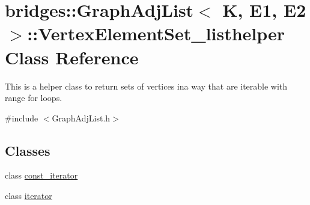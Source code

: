 \hypertarget{classbridges_1_1_graph_adj_list_1_1_vertex_element_set__listhelper}{}\section{bridges\+::Graph\+Adj\+List$<$ K, E1, E2 $>$\+::Vertex\+Element\+Set\+\_\+listhelper Class Reference}
\label{classbridges_1_1_graph_adj_list_1_1_vertex_element_set__listhelper}


This is a helper class to return sets of vertices ina way that are iterable with range for loops.  




{\ttfamily \#include $<$Graph\+Adj\+List.\+h$>$}

\subsection*{Classes}
\begin{DoxyCompactItemize}
\item 
class \mbox{\hyperlink{classbridges_1_1_graph_adj_list_1_1_vertex_element_set__listhelper_1_1const__iterator}{const\+\_\+iterator}}
\item 
class \mbox{\hyperlink{classbridges_1_1_graph_adj_list_1_1_vertex_element_set__listhelper_1_1iterator}{iterator}}
\end{DoxyCompactItemize}
